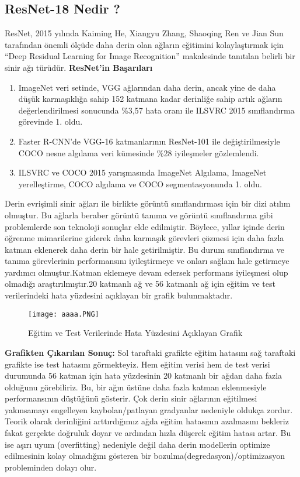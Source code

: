 \documentclass[12pt]{article}
\begin{document}
\subsection{ResNet-18 Nedir ?}
ResNet, 2015 yılında Kaiming He, Xiangyu Zhang, Shaoqing Ren ve Jian Sun tarafından önemli ölçüde daha derin olan ağların eğitimini kolaylaştırmak için “Deep Residual Learning for Image Recognition” makalesinde tanıtılan belirli bir sinir ağı türüdür.\cite{youtube-video}\newline
\newline
\textbf{ResNet'in Başarıları }
\begin{enumerate}
    \item ImageNet veri setinde, VGG ağlarından daha derin, ancak yine de daha düşük karmaşıklığa sahip 152 katmana kadar derinliğe sahip artık ağların değerlendirilmesi sonucunda \%3,57 hata oranı ile ILSVRC 2015 sınıflandırma görevinde 1. oldu.
    \item Faster R-CNN’de VGG-16 katmanlarının ResNet-101 ile değiştirilmesiyle COCO nesne algılama veri kümesinde \%28 iyileşmeler gözlemlendi.
    \item ILSVRC ve COCO 2015 yarışmasında ImageNet Algılama, ImageNet yerelleştirme, COCO algılama ve COCO segmentasyonunda 1. oldu.
\end{enumerate}
Derin evrişimli sinir ağları ile birlikte görüntü sınıflandırması için bir dizi atılım olmuştur. Bu ağlarla beraber görüntü tanıma ve görüntü sınıflandırma gibi problemlerde son teknoloji sonuçlar elde edilmiştir. Böylece, yıllar içinde derin öğrenme mimarilerine giderek daha karmaşık görevleri çözmesi için daha fazla katman eklenerek daha derin bir hale getirilmiştir. Bu durum sınıflandırma ve tanıma görevlerinin performansını iyileştirmeye ve onları sağlam hale getirmeye yardımcı olmuştur.Katman eklemeye devam edersek  performans iyileşmesi olup olmadığı araştırılmıştır.20 katmanlı ağ ve 56 katmanlı ağ için eğitim ve test verilerindeki hata yüzdesini açıklayan bir grafik bulunmaktadır.\cite{he2016deep}
\begin{figure}[h]
    \centering
    \texttt{[image: aaaa.PNG]}
    \caption{Eğitim ve Test Verilerinde Hata Yüzdesini Açıklayan Grafik}
    \label{fig:enter-label}
\end{figure}\newline
\newline
\textbf{Grafikten Çıkarılan Sonuç:}
Sol taraftaki grafikte eğitim hatasını sağ taraftaki grafikte ise test hatasını görmekteyiz. Hem eğitim verisi hem de test verisi durumunda 56 katman için hata yüzdesinin 20 katmanlı bir ağdan daha fazla olduğunu görebiliriz. Bu, bir ağın üstüne daha fazla katman eklenmesiyle performansının düştüğünü gösterir. Çok derin sinir ağlarının eğitilmesi yakınsamayı engelleyen kaybolan/patlayan gradyanlar nedeniyle oldukça zordur. Teorik olarak derinliğini arttırdığımız ağda eğitim hatasının azalmasını bekleriz fakat gerçekte doğruluk doyar ve ardından hızla düşerek eğitim hatası artar. Bu ise aşırı uyum (overfitting) nedeniyle değil daha derin modellerin optimize edilmesinin kolay olmadığını gösteren bir bozulma(degredasyon)/optimizasyon probleminden dolayı olur.\\
\end{document}
